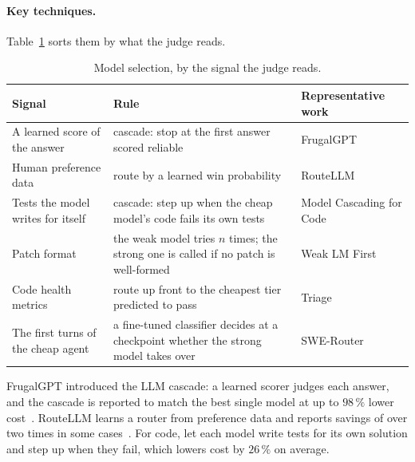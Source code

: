 \paragraph{Key techniques.} Table~\ref{tab:rel-f} sorts them by what the judge
reads.

\begin{table}[htbp]
\centering
\caption{Model selection, by the signal the judge reads.}
\label{tab:rel-f}
\footnotesize
\begin{tabularx}{\textwidth}{@{}>{\raggedright\arraybackslash}p{} >{\raggedright\arraybackslash}X >{\raggedright\arraybackslash}p{}@{}}
\toprule
Signal & Rule & Representative work\\
\midrule
A learned score of the answer & cascade: stop at the first answer scored reliable & FrugalGPT~\citep{chen2023frugalgpt}\\
Human preference data & route by a learned win probability & RouteLLM~\citep{ong2024routellm}\\
Tests the model writes for itself & cascade: step up when the cheap model's code fails its own tests & Model Cascading for Code~\citep{chen2024cascading}\\
Patch format & the weak model tries $n$ times; the strong one is called if no patch is well-formed & Weak LM First~\citep{gandhi2025strongweak}\\
Code health metrics & route up front to the cheapest tier predicted to pass & Triage~\citep{madeyski2026triage}\\
The first turns of the cheap agent & a fine-tuned classifier decides at a checkpoint whether the strong model takes over & SWE-Router~\citep{son2026swerouter}\\
\bottomrule
\end{tabularx}
\end{table}

FrugalGPT introduced the LLM cascade: a learned scorer judges each answer, and
the cascade is reported to match the best single model at up to $98\,\%$ lower
cost~\citep{chen2023frugalgpt}. RouteLLM learns a router from preference data
and reports savings of over two times in some cases~\citep{ong2024routellm}.
For code, \citet{chen2024cascading} let each model write tests for its own
solution and step up when they fail, which lowers cost by $26\,\%$ on average.

